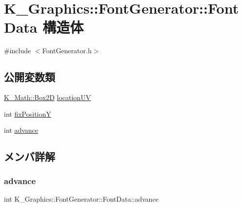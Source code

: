 \hypertarget{struct_k___graphics_1_1_font_generator_1_1_font_data}{}\section{K\+\_\+\+Graphics\+:\+:Font\+Generator\+:\+:Font\+Data 構造体}
\label{struct_k___graphics_1_1_font_generator_1_1_font_data}


{\ttfamily \#include $<$Font\+Generator.\+h$>$}

\subsection*{公開変数類}
\begin{DoxyCompactItemize}
\item 
\mbox{\hyperlink{struct_k___math_1_1_box2_d}{K\+\_\+\+Math\+::\+Box2D}} \mbox{\hyperlink{struct_k___graphics_1_1_font_generator_1_1_font_data_a5e3be02902ccaca08f784d24c0c011a1}{location\+UV}}
\item 
int \mbox{\hyperlink{struct_k___graphics_1_1_font_generator_1_1_font_data_a495dfde57ef35cebf27f26723a9328a9}{fix\+PositionY}}
\item 
int \mbox{\hyperlink{struct_k___graphics_1_1_font_generator_1_1_font_data_a95a1bfc9d1f370cd3f639355c73c86a0}{advance}}
\end{DoxyCompactItemize}


\subsection{メンバ詳解}
\mbox{\label{struct_k___graphics_1_1_font_generator_1_1_font_data_a95a1bfc9d1f370cd3f639355c73c86a0}} 
\subsubsection{\texorpdfstring{advance}{advance}}
{\footnotesize\ttfamily int K\+\_\+\+Graphics\+::\+Font\+Generator\+::\+Font\+Data\+::advance}

\mbox{\label{struct_k___graphics_1_1_font_generator_1_1_font_data_a495dfde57ef35cebf27f26723a9328a9}} 
